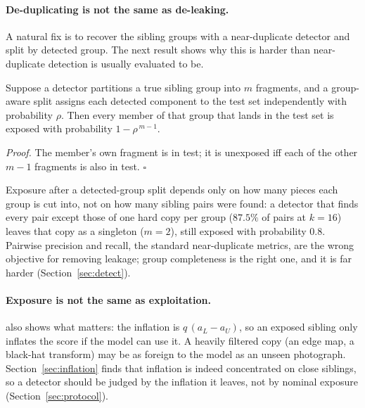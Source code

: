 \paragraph{De-duplicating is not the same as de-leaking.}
A natural fix is to recover the sibling groups with a near-duplicate detector and split by detected group. The next result shows why this is harder than near-duplicate detection is usually evaluated to be.

\begin{proposition}[Fragmentation]\label{prop:frag}
Suppose a detector partitions a true sibling group into $m$ fragments, and a group-aware split assigns each detected component to the test set independently with probability $\rho$. Then every member of that group that lands in the test set is exposed with probability $1-\rho^{\,m-1}$.
\end{proposition}
\emph{Proof.} The member's own fragment is in test; it is unexposed iff each of the other $m-1$ fragments is also in test. \hfill$\square$

Exposure after a detected-group split depends only on how many pieces each group is cut into, not on how many sibling pairs were found: a detector that finds every pair except those of one hard copy per group ($87.5\%$ of pairs at $k=16$) leaves that copy as a singleton ($m=2$), still exposed with probability $0.8$. Pairwise precision and recall, the standard near-duplicate metrics, are the wrong objective for removing leakage; group completeness is the right one, and it is far harder (Section~\ref{sec:detect}).

\paragraph{Exposure is not the same as exploitation.}
 also shows what matters: the inflation is $q\,(a_L-a_U)$, so an exposed sibling only inflates the score if the model can use it. A heavily filtered copy (an edge map, a black-hat transform) may be as foreign to the model as an unseen photograph. Section~\ref{sec:inflation} finds that inflation is indeed concentrated on close siblings, so a detector should be judged by the inflation it leaves, not by nominal exposure (Section~\ref{sec:protocol}).
